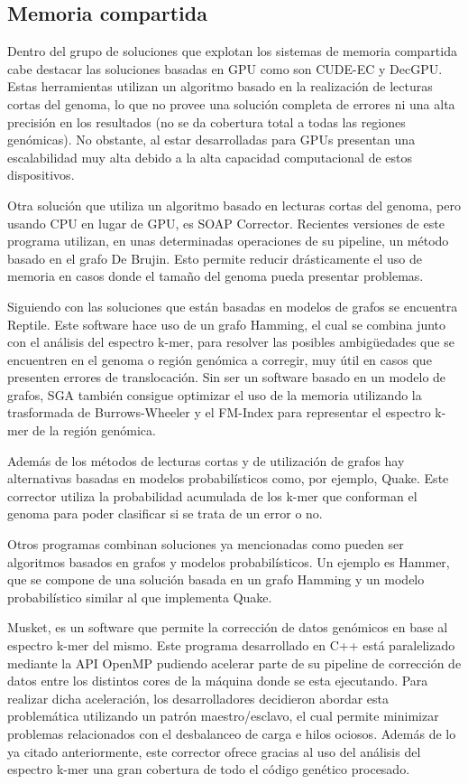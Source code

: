 \documentclass[conference]{IEEEtran}
\begin{document}
\subsection{Memoria compartida}

Dentro del grupo de soluciones que explotan los sistemas de memoria compartida cabe destacar las soluciones basadas en GPU como son CUDE-EC\cite{cuda-ec} y DecGPU\cite{decgpu}. Estas herramientas utilizan un algoritmo basado en la realización de lecturas cortas del genoma, lo que no provee una solución completa de errores ni una alta precisión en los resultados (no se da cobertura total a todas las regiones genómicas). No obstante, al estar desarrolladas para GPUs presentan una escalabilidad muy alta debido a la alta capacidad computacional de estos dispositivos.

Otra solución que utiliza un algoritmo basado en lecturas cortas del genoma, pero usando CPU en lugar de GPU, es SOAP Corrector\cite{soap_corrector}. Recientes versiones de este programa utilizan, en unas determinadas operaciones de su pipeline, un método basado en el grafo De Brujin. Esto permite reducir drásticamente el uso de memoria en casos donde el tamaño del genoma pueda presentar problemas.

Siguiendo con las soluciones que están basadas en modelos de grafos se encuentra Reptile\cite{reptile}. Este software hace uso de un grafo Hamming, el cual se combina junto con el análisis del espectro k-mer, para resolver las posibles ambigüedades que se encuentren en el genoma o región genómica a corregir, muy útil en casos que presenten errores de translocación. Sin ser un software basado en un modelo de grafos, SGA\cite{sga} también consigue optimizar el uso de la memoria utilizando la trasformada de Burrows-Wheeler y el FM-Index para representar el espectro k-mer de la región genómica.

Además de los métodos de lecturas cortas y de utilización de grafos hay alternativas basadas en modelos probabilísticos como, por ejemplo, Quake\cite{quake}. Este corrector utiliza la probabilidad acumulada de los k-mer que conforman el genoma para poder clasificar si se trata de un error o no.

Otros programas combinan soluciones ya mencionadas como pueden ser algoritmos basados en grafos y modelos probabilísticos. Un ejemplo es Hammer\cite{hammer}, que se compone de una solución basada en un grafo Hamming y un modelo probabilístico similar al que implementa Quake.

Musket\cite{musket}, es un software que permite la corrección de datos genómicos en base al espectro k-mer del mismo. Este programa desarrollado en C++ está paralelizado mediante la API OpenMP\cite{openmp} pudiendo acelerar parte de su pipeline de corrección de datos entre los distintos cores de la máquina donde se esta ejecutando. Para realizar dicha aceleración, los desarrolladores decidieron abordar esta problemática utilizando un patrón maestro/esclavo, el cual permite minimizar problemas relacionados con el desbalanceo de carga e hilos ociosos. Además de lo ya citado anteriormente, este corrector ofrece gracias al uso del análisis del espectro k-mer una gran cobertura de todo el código genético procesado.
\end{document}

